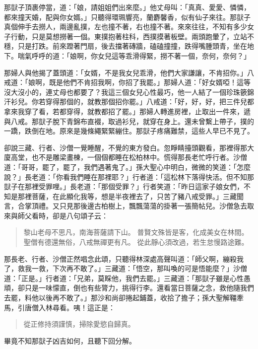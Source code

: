 那獃子頂裹停當，道：「娘，請姐姐們出來麼。」他丈母叫：「真真、愛愛、憐憐，都來撞天婚，配與你女婿。」只聽得環珮響亮，蘭麝馨香，似有仙子來往。那獃子真個伸手去撈人，兩邊亂撲，左也撞不著，右也撞不著。來來往往，不知有多少女子行動，只是莫想撈著一個。東撲抱著柱科，西撲摸著板壁。兩頭跑暈了，立站不穩，只是打跌。前來蹬著門扇，後去擋著磚牆，磕磕撞撞，跌得嘴腫頭青，坐在地下。喘氣呼呼的道：「娘啊，你女兒這等乖滑得緊，撈不著一個，奈何，奈何？」

那婦人與他揭了蓋頭道：「女婿，不是我女兒乖滑，他們大家謙讓，不肯招你。」八戒道：「娘啊，既是他們不肯招我啊，你招了我罷。」那婦人道：「好女婿啞！這等沒大沒小的，連丈母也都要了？我這三個女兒心性最巧，他一人結了一個珍珠篏錦汗衫兒。你若穿得那個的，就教那個招你罷。」八戒道：「好，好，好，把三件兒都拿來我穿了看，若都穿得，就教都招了罷。」那婦人轉進房裡，止取出一件來，遞與八戒。那獃子脫下青錦布直裰，取過衫兒，就穿在身上。還未曾繫上帶子，撲的一蹻，跌倒在地。原來是幾條繩緊緊繃住。那獃子疼痛難禁，這些人早已不見了。

卻說三藏、行者、沙僧一覺睡醒，不覺的東方發白。忽睜睛擡頭觀看，那裡得那大廈高堂，也不是雕梁畫棟，一個個都睡在松柏林中。慌得那長老忙呼行者。沙僧道：「哥哥，罷了，罷了，我們遇著鬼了。」孫大聖心中明白，微微的笑道：「怎麼說？」長老道：「你看我們睡在那裡耶？」行者道：「這松林下落得快活。但不知那獃子在那裡受罪哩。」長老道：「那個受罪？」行者笑道：「昨日這家子娘女們，不知是那裡菩薩，在此顯化我等，想是半夜裡去了，只苦了豬八戒受罪。」三藏聞言，合掌頂禮。又只見那後邊古柏樹上，飄飄蕩蕩的掛著一張簡帖兒。沙僧急去取來與師父看時，卻是八句頌子云：
\begin{quote}
黎山老母不思凡，南海菩薩請下山。
普賢文殊皆是客，化成美女在林間。
聖僧有德還無俗，八戒無禪更有凡。
從此靜心須改過，若生怠慢路途難。
\end{quote}

那長老、行者、沙僧正然唱念此頌，只聽得林深處高聲叫道：「師父啊，繃殺我了，救我一救，下次再不敢了。」三藏道：「悟空，那叫喚的可是悟能麼？」沙僧道：「正是。」行者道：「兄弟，莫睬他，我們去罷。」三藏道：「那獃子雖是心性愚頑，卻只是一味懞直，倒也有些膂力，挑得行李。還看當日菩薩之念，救他隨我們去罷，料他以後再不敢了。」那沙和尚卻捲起鋪蓋，收拾了擔子；孫大聖解韁牽馬，引唐僧入林尋看。咦！這正是：
\begin{quote}
從正修持須謹慎，掃除愛慾自歸真。
\end{quote}

畢竟不知那獃子凶吉如何，且聽下回分解。
